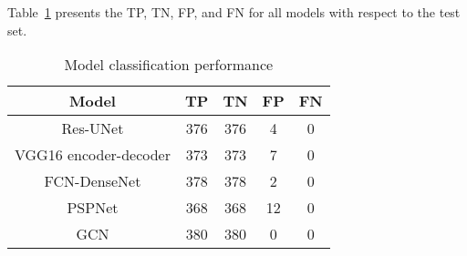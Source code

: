 Table~\ref{tab:table_performance} presents the TP, TN, FP, and FN for all models with respect to the test set.
\begin{table}[]
	\centering
	\caption{Model classification performance}
	\label{tab:table_performance}
	\begin{tabular}{ccccc} \hline
		Model& TP & TN & FP & FN \\ \hline
		Res-UNet & 376 & 376 & 4 & 0 \\ 
		VGG16 encoder-decoder & 373 & 373 & 7 & 0 \\ 
		FCN-DenseNet & 378 & 378 & 2 & 0 \\ 
		PSPNet & 368 & 368 & 12 & 0 \\ 
		GCN & 380 & 380 & 0 & 0 \\ \hline
	\end{tabular}	
\end{table}

